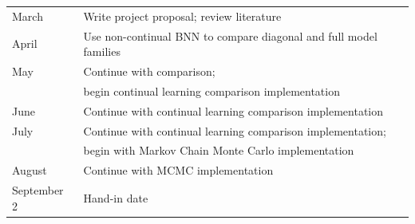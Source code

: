 \documentclass[a4paper,11=0pt]{article}
\begin{document}
\begin{tabular}{l|l}
\hline
March 	& Write project proposal; review literature\\
April	& Use non-continual BNN to compare diagonal and full model families\\ %
May		& Continue with comparison; \\ %
&begin continual learning comparison implementation \\
June 	& Continue with continual learning comparison implementation\\
July	& Continue with continual learning comparison implementation; \\
&begin with Markov Chain Monte Carlo implementation\\
August	& Continue with MCMC implementation\\%
September 2 & Hand-in date\\
\hline
\end{tabular}


\end{document}
